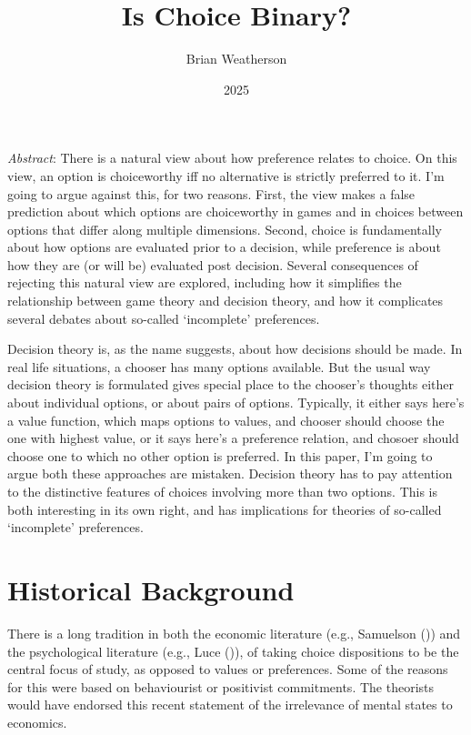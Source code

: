 \documentclass[
  11pt,
  letterpaper,
  DIV=11,
  numbers=noendperiod,
  twoside]{scrartcl}
\title{Is Choice Binary?}
\author{Brian Weatherson}
\date{2025}
\renewenvironment{abstract}
 {\vspace{-1.25cm}
 \quotation\small\noindent\emph{Abstract}:}
 {\endquotation}
\begin{document}
\maketitle
\begin{abstract}
There is a natural view about how preference relates to choice. On this
view, an option is choiceworthy iff no alternative is strictly preferred
to it. I'm going to argue against this, for two reasons. First, the view
makes a false prediction about which options are choiceworthy in games
and in choices between options that differ along multiple dimensions.
Second, choice is fundamentally about how options are evaluated prior to
a decision, while preference is about how they are (or will be)
evaluated post decision. Several consequences of rejecting this natural
view are explored, including how it simplifies the relationship between
game theory and decision theory, and how it complicates several debates
about so-called `incomplete' preferences.
\end{abstract}


Decision theory is, as the name suggests, about how decisions should be
made. In real life situations, a chooser has many options available. But
the usual way decision theory is formulated gives special place to the
chooser's thoughts either about individual options, or about pairs of
options. Typically, it either says here's a value function, which maps
options to values, and chooser should choose the one with highest value,
or it says here's a preference relation, and chosoer should choose one
to which no other option is preferred. In this paper, I'm going to argue
both these approaches are mistaken. Decision theory has to pay attention
to the distinctive features of choices involving more than two options.
This is both interesting in its own right, and has implications for
theories of so-called `incomplete' preferences.

\section{Historical Background}\label{sec-history}

There is a long tradition in both the economic literature (e.g.,
Samuelson ()) and the psychological
literature (e.g., Luce ()), of taking
choice dispositions to be the central focus of study, as opposed to
values or preferences. Some of the reasons for this were based on
behaviourist or positivist commitments. The theorists would have
endorsed this recent statement of the irrelevance of mental states to
economics.
\end{document}
